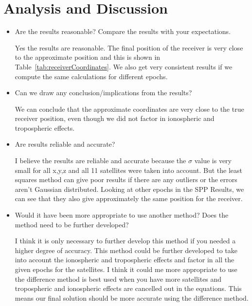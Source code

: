 

\section{Analysis and Discussion} %
\label{sec:analysis_and_discussion}
\begin{itemize}
	\item Are the results reasonable? Compare the results with your expectations.
	
	Yes the results are reasonable.  The final position of the receiver is very close to the approximate position and this is shown in Table~\ref{tab:receiverCoordinates}.  We also get very consistent results if we compute the same calculations for different epochs.
	\item Can we draw any conclusion/implications from the results?  
	
	We can conclude that the approximate coordinates are very close to the true receiver position, even though we did not factor in ionospheric and tropospheric effects.  
	\item Are results reliable and accurate?
	
	I believe the results are reliable and accurate because the $\sigma$ value is very small for all x,y,z and all 11 satellites were taken into account.  But the least squares method can give poor results if there are any outliers or the errors aren't Gaussian distributed.\cite{Garcia:1999:NMP:554354}  Looking at other epochs in the SPP Results, we can see that they also give approximately the same position for the receiver.
	\item Would it have been more appropriate to use another method? Does the method need to be further developed?
	
	I think it is only necessary to further develop this method if you needed a higher degree of accuracy.  This method could be further developed to take into account the ionospheric and tropospheric effects and factor in all the given epochs for the satellites.  I think it could me more appropriate to use the difference method is best used when you have more satellites and tropospheric and ionospheric effects are cancelled out in the equations.  This means our final solution should be more accurate using the difference method.
\end{itemize}

